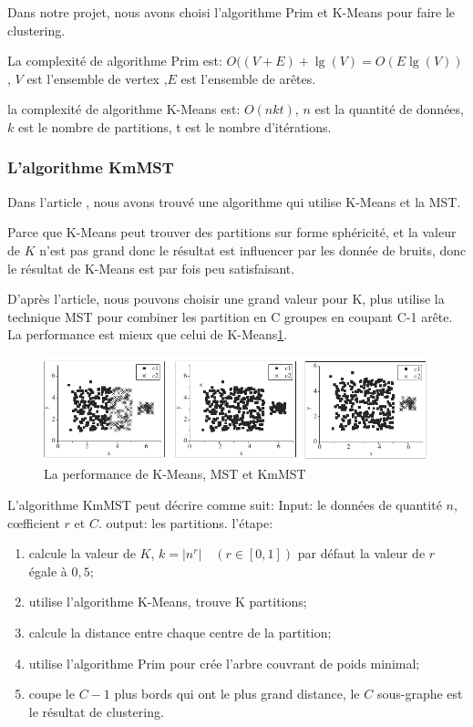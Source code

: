 Dans notre projet, nous avons choisi l'algorithme Prim et K-Means pour faire le clustering. 

La complexité de algorithme Prim est: $O((V+E)+\lg (V) = O(E \lg (V)) $, $V$ est l'ensemble de vertex ,$E$ est l'ensemble de arêtes.

la complexité de algorithme K-Means est: $O(nkt)$, $n$ est la quantité de données, $k$ est le nombre de partitions, t est le nombre d'itérations.
\subsubsection{L'algorithme KmMST}

Dans l'article \cite{KmMst}, nous avons trouvé une algorithme qui utilise K-Means et la MST. 

Parce que K-Means peut trouver des partitions sur forme sphéricité, et la valeur de $K$ n'est pas grand donc le résultat est influencer par les donnée de bruits, donc le résultat de K-Means est par fois peu satisfaisant. 

D'après l'article, nous pouvons choisir une grand valeur pour K, plus utilise la technique MST pour combiner les partition en C groupes en coupant C-1 arête. La performance est mieux que celui de K-Means\ref{fig:kmmst}.
\begin{figure}[H]
\centering
\includegraphics[width=1.0\linewidth]{images/kmmst}
\caption{La performance de K-Means, MST et KmMST}
\label{fig:kmmst}
\end{figure}

L'algorithme KmMST peut décrire comme suit:
Input: le données de quantité $n$, c\oe fficient $r$ et $C$.
output: les partitions.
l'étape:
\begin{enumerate}
\item calcule la valeur de $K$, $k=\left\vert n^r \right\vert \quad  \left( r \in \left[ 0,1 \right]  \right) $ par défaut la valeur de $r$ égale à $0,5$;
\item utilise l'algorithme K-Means, trouve K partitions;
\item calcule la distance entre chaque centre de la partition;
\item utilise l'algorithme Prim pour crée l'arbre couvrant de poids minimal;
\item coupe le $C-1$ plus bords qui ont le plus grand distance, le $C$ sous-graphe est le résultat de clustering.
\end{enumerate}

